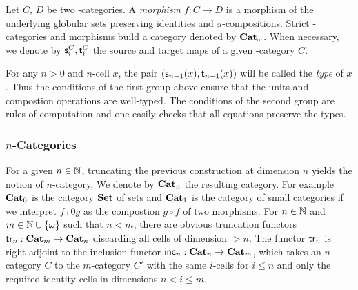 Let $C$, $D$ be two \oo-categories. A {\em morphism} $f:C\to D$ is a
morphism of the underlying globular sets preserving identities and
$\comp i$-compositions. Strict \oo-categories and morphisms build a
category denoted by $\mathbf{Cat}_{\omega}$. When necessary, we denote by $\mathsf{s}_{i}^C,\mathsf{t}_{i}^C$ the source and target maps of a given \oo-category $C$.
\begin{remark}
  For any $n>0$ and $n$-cell $x$, the pair $(\mathsf{s}_{n-1}(x),\mathsf{t}_{n-1}(x))$ will be called the {\em type} of $x$. Thus the conditions of the first group above ensure that the units and compostion operations are well-typed. The conditions of the second group are rules of computation and one easily checks that all equations preserve the types. 
\end{remark}
\subsubsection{$n$-Categories}\label{ssubsec:ncat}
For a given $n\in\mathbb N$, truncating the previous construction at dimension $n$ yields the notion of $n$-category.  We denote by $\mathbf{Cat}_{n}$ the resulting category. For example $\mathbf{Cat}_{0}$ is the category $\mathbf{Set}$ of sets and $\mathbf{Cat}_{1}$ is the category of small categories if we interpret $f\comp 0 g$ as the compostion $g\circ f$ of two morphisms.
For $n\in\mathbb N$ and $m\in\mathbb N\cup \left\{\omega\right\}$ such that $n<m$, there are 
obvious truncation functors $\mathsf{tr}_{n}:\mathbf{Cat}_{m}\to \mathbf{Cat}_{n}$ discarding all cells of dimension $>n$. The functor $\mathsf{tr}_{n}$ is right-adjoint to the inclusion functor  $\mathsf{inc}_{n}:\mathbf{Cat}_{n}\to\mathbf{Cat}_{m}$, which takes an $n$-category $C$ to the $m$-category $C'$ with the same $i$-cells for $i\leq n$ and only the required identity cells in dimensions $n<i\leq m$.

